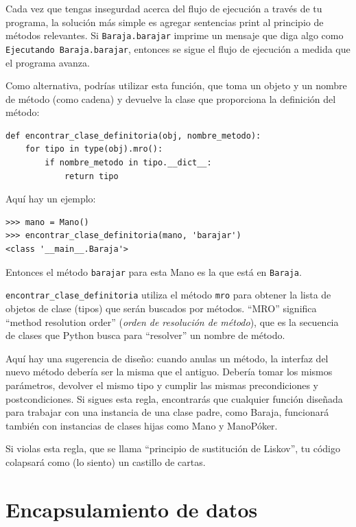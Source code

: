 \documentclass[10pt]{book}
\begin{document}
Cada vez que tengas insegurdad acerca del flujo de ejecución a través de tu
programa, la solución más simple es agregar sentencias print al
principio de métodos relevantes.  Si {\tt Baraja.barajar} imprime un
mensaje que diga algo como {\tt Ejecutando Baraja.barajar}, entonces
se sigue el flujo de ejecución a medida que el programa avanza.

Como alternativa, podrías utilizar esta función, que toma un
objeto y un nombre de método (como cadena) y devuelve la clase que
proporciona la definición del método:

\begin{verbatim}
def encontrar_clase_definitoria(obj, nombre_metodo):
    for tipo in type(obj).mro():
        if nombre_metodo in tipo.__dict__:
            return tipo
\end{verbatim}
%
Aquí hay un ejemplo:

\begin{verbatim}
>>> mano = Mano()
>>> encontrar_clase_definitoria(mano, 'barajar')
<class '__main__.Baraja'>
\end{verbatim}
%
Entonces el método {\tt barajar} para esta Mano es la que está en {\tt Baraja}.

\verb"encontrar_clase_definitoria" utiliza el método {\tt mro} para obtener la lista de
objetos de clase (tipos) que serán buscados por métodos.  ``MRO''
significa ``method resolution order'' ({\em orden de resolución de método}), que es la secuencia de
clases que Python busca para ``resolver'' un nombre de método.

Aquí hay una sugerencia de diseño: cuando anulas un método,
la interfaz del nuevo método debería ser la misma que el antiguo.  Debería
tomar los mismos parámetros, devolver el mismo tipo y cumplir las
mismas precondiciones y postcondiciones.  Si sigues esta regla,
encontrarás que cualquier función diseñada para trabajar con una instancia de una
clase padre, como Baraja, funcionará también con instancias de
clases hijas como Mano y ManoPóker.

Si violas esta regla, que se llama ``principio de sustitución
de Liskov'', tu código colapsará como (lo siento) un castillo de cartas.


\section{Encapsulamiento de datos}
\end{document}
